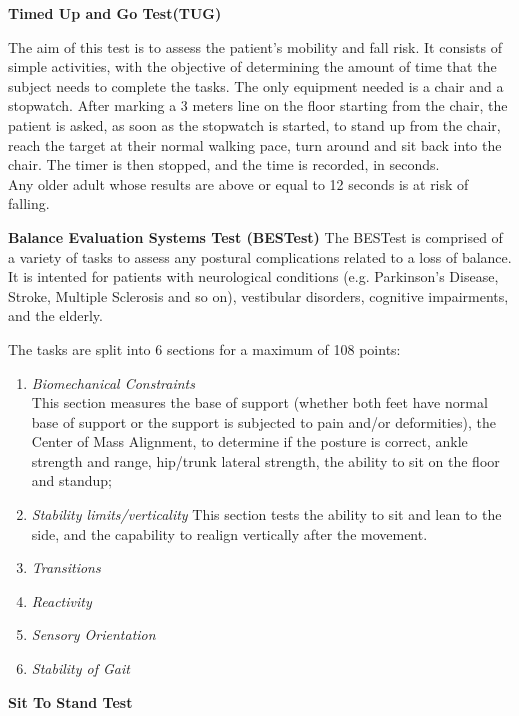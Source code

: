 \vspace{0.3cm}
\textbf{Timed Up and Go Test(TUG)}

The aim of this test is to assess the patient's mobility and fall risk.
It consists of simple activities, with the objective of determining the amount of time that the subject needs to complete the tasks. The only equipment needed is a chair and a stopwatch.
After marking a 3 meters line on the floor starting from the chair, the patient is asked, as soon as the stopwatch is started, to stand up from the chair, reach the target at their normal walking pace, turn around and sit back into the chair.
The timer is then stopped, and the time is recorded, in seconds. \\Any older adult whose results are above or equal to 12 seconds is at risk of falling.

\vspace{0.3cm}
\textbf{Balance Evaluation Systems Test (BESTest)}
The BESTest is comprised of a variety of tasks to assess any postural complications related to a loss of balance. It is intented for patients with neurological conditions (e.g. Parkinson's Disease, Stroke, Multiple Sclerosis and so on), vestibular disorders,
cognitive impairments, and the elderly. 

The tasks are split into 6 sections for a maximum of 108 points:
\begin{enumerate}
\itemsep0cm 
    \item \textit{Biomechanical Constraints}
    \\This section measures the base of support (whether both feet have normal base of support or the support is subjected to pain and/or deformities), the Center of Mass Alignment, to determine if the posture is correct, ankle strength and range, hip/trunk lateral strength, the ability to sit on the floor and standup;
    \item \textit{Stability limits/verticality}
    This section tests the ability to sit and lean to the side, and the capability to realign vertically after the movement. 
    \item \textit{Transitions}
    \item \textit{Reactivity}
    \item \textit{Sensory Orientation}
    \item \textit{Stability of Gait}
\end{enumerate}


\vspace{0.3cm}
\textbf{Sit To Stand Test}

